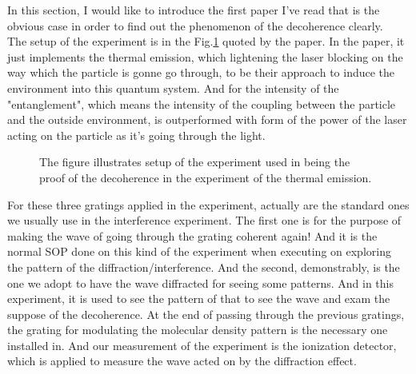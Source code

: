 \documentclass[final,1p,12pt]{elsarticle}
\begin{document}
In this section, I would like to introduce the first paper\cite{Hackerm_ller_2004} I've read that is the obvious case in order to find out the phenomenon of the decoherence clearly.\\

The setup of the experiment is in the Fig.\ref{666} quoted by the paper. In the paper, it just implements the thermal emission, which lightening the laser blocking on the way which the particle is gonne go through, to be their approach to induce the environment into this quantum system. And for the intensity of the "entanglement", which means the intensity of the coupling between the particle and the outside environment, is outperformed with form of the power of the laser acting on the particle as it's going through the light.\\

\begin{figure}
\begin{center}
\end{center}
\caption{The figure illustrates setup of the experiment used in being the proof of the decoherence in the experiment of the thermal emission.}
\label{666}
\end{figure}

For these three gratings applied in the experiment, actually are the standard ones we usually use in the interference experiment. The first one is for the purpose of making the wave of going through the grating coherent again! And it is the normal SOP done on this kind of the experiment when executing on exploring the pattern of the diffraction/interference. And the second, demonstrably, is the one we adopt to have the wave diffracted for seeing some patterns. And in this experiment, it is used to see the pattern of that to see the wave and exam the suppose of the decoherence.  At the end of passing through the previous gratings, the grating for modulating the molecular density pattern is the necessary one installed in. And our measurement of the experiment is the ionization detector, which is applied to measure the wave acted on by the diffraction effect.\\
\end{document}
